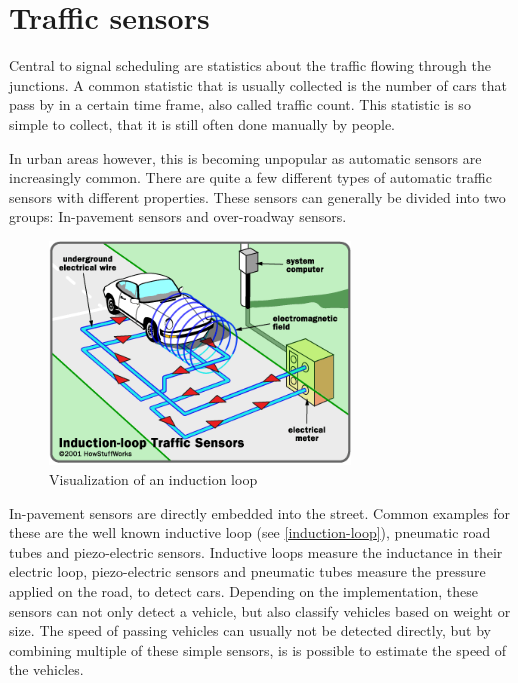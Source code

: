 \section{Traffic sensors}
\label{trafficSensors}

Central to signal scheduling are statistics about the traffic flowing through the junctions. A common statistic that is usually collected is the number of cars that pass by in a certain time frame, also called traffic count. This statistic is so simple to collect, that it is still often done manually by people.

In urban areas however, this is becoming unpopular as automatic sensors are increasingly common. There are quite a few different types of automatic traffic sensors with different properties. These sensors can generally be divided into two groups: In-pavement sensors and over-roadway sensors. \cite{tmg}

\begin{figure}[ht]
	\centering
	\includegraphics[width=8cm]{figures/induction-loop}
	\caption{Visualization of an induction loop}
	\label{induction-loop}
\end{figure}

In-pavement sensors are directly embedded into the street. Common examples for these are the well known inductive loop (see \autoref{induction-loop}), pneumatic road tubes and piezo-electric sensors. Inductive loops measure the inductance in their electric loop, piezo-electric sensors and pneumatic tubes measure the pressure applied on the road, to detect cars. Depending on the implementation, these sensors can not only detect a vehicle, but also classify vehicles based on weight or size. The speed of passing vehicles can usually not be detected directly, but by combining multiple of these simple sensors, is is possible to estimate the speed of the vehicles.

